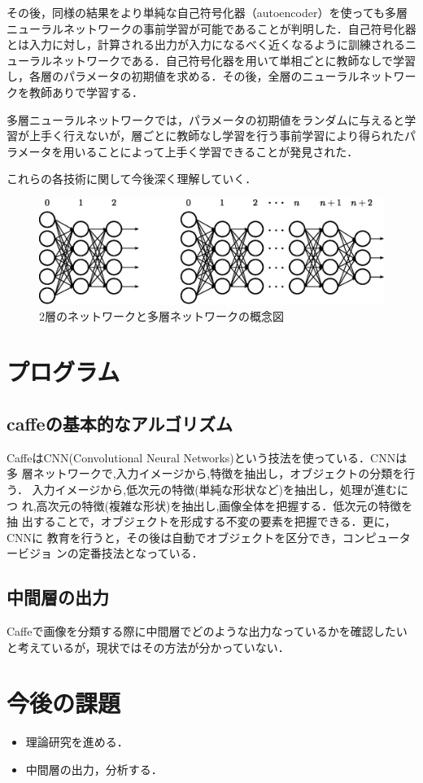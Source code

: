 \documentclass[a4paper,10pt]{jsarticle}
\begin{document}
その後，同様の結果をより単純な自己符号化器（autoencoder）を使っても多層ニューラルネットワークの事前学習が可能であることが判明した．自己符号化器とは入力に対し，計算される出力が入力になるべく近くなるように訓練されるニューラルネットワークである．自己符号化器を用いて単相ごとに教師なしで学習し，各層のパラメータの初期値を求める．その後，全層のニューラルネットワークを教師ありで学習する．

多層ニューラルネットワークでは，パラメータの初期値をランダムに与えると学習が上手く行えないが，層ごとに教師なし学習を行う事前学習により得られたパラメータを用いることによって上手く学習できることが発見された．

これらの各技術に関して今後深く理解していく．

\begin{figure}[tb]
  \begin{center}
    \includegraphics[clip,width=12cm]{./fig/eps/Deep_Learning_concept.eps}
  \end{center}
  \caption{2層のネットワークと多層ネットワークの概念図}
  \label{fig:2層のネットワークと多層ネットワークの概念図}
\end{figure}

\section{プログラム}
\subsection{caffeの基本的なアルゴリズム}
CaffeはCNN(Convolutional Neural Networks)という技法を使っている．CNNは多
層ネットワークで,入力イメージから,特徴を抽出し，オブジェクトの分類を行う．
入力イメージから,低次元の特徴(単純な形状など)を抽出し，処理が進むにつ
れ,高次元の特徴(複雑な形状)を抽出し,画像全体を把握する．低次元の特徴を抽
出することで，オブジェクトを形成する不変の要素を把握できる．更に，CNNに
教育を行うと，その後は自動でオブジェクトを区分でき，コンピュータービジョ
ンの定番技法となっている．

\subsection{中間層の出力}
Caffeで画像を分類する際に中間層でどのような出力なっているかを確認したいと考えているが，現状ではその方法が分かっていない．

\section{今後の課題}
\begin{itemize}
 \item 理論研究を進める．
 \item 中間層の出力，分析する．
\end{itemize}
\end{document}
